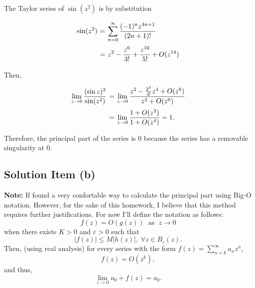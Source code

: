 The Taylor series of $\sin (z^2)$ is by substitution
\[ \everymath{\displaystyle}
\arraycolsep=1.8pt\def\arraystretch{2.5}
\begin{array}{rcl}
    \sin(z^2) & = & \sum_{n = 0}^{\infty} \frac{(-1)^n z^{4n+1}}{(2n+1)!}\\
    & = & z^2 - \frac{z^6}{3!} + \frac{z^{10}}{5!} + O(z^{14})
\end{array} \]

Then,
\[ \everymath{\displaystyle}
\arraycolsep=1.8pt\def\arraystretch{2.5}
\begin{array}{rcl}
    \lim_{z\to 0} \frac{(\sin z)^2}{\sin(z^2)} & = & \lim_{z\to 0} \frac{z^2 - \frac{2^3}{4!} z^4 + O(z^6) }{z^2 + O(z^6)}\\
    & = & \lim_{z\to 0} \frac{1 + O(z^2)}{1 + O(z^4)} = 1.
\end{array} \]

Therefore, the principal part of the series is 0 because the series has a removable singularity at 0.

\subsection*{Solution Item (b)}

\textbf{Note:} If found a very confortable way to calculate the principal part using Big-O notation. However, for the sake of this homework, I believe that this method requires further justifications. For now I'll define the notation as follows:
\[ f(z) = O(g(z))\; \mbox{ as }\; z \to 0 \]
when there exists $K > 0$ and $\varepsilon > 0$ such that
\[ |f(z)| \leq M |h(z)|,\; \forall z \in B_\varepsilon(z). \]
Then, (using real analysis) for every series with the form $f(z) = \sum_{n = k}^{\infty} a_n z^n$,
\[ f(z) = O(z^k), \]
and thus,
\[ \lim_{z \to 0} a_0 + f(z) = a_0. \]



